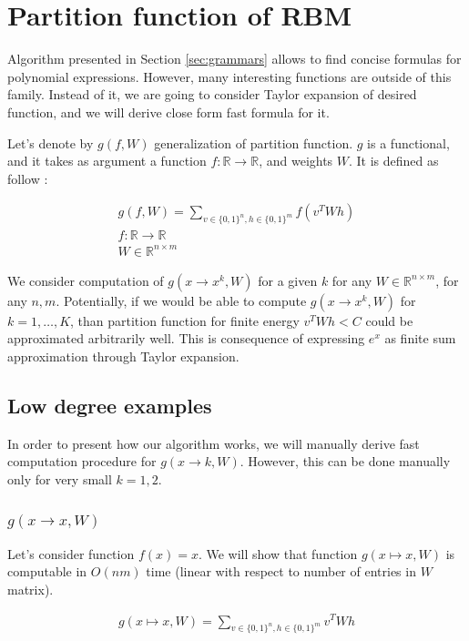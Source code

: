 \documentclass{article}
\begin{document}
\section{Partition function of RBM} \label{partitionfunction}
Algorithm presented in Section
\ref{sec:grammars} allows to find concise formulas for polynomial expressions.
However, many interesting functions are outside of this family.  Instead of it,
we are going to consider Taylor expansion of desired function, and we will
derive close form fast formula for it.

Let's denote by $g(f, W)$ generalization of partition function. 
$g$ is a functional, and it takes as argument a function $f : \mathbb{R} \rightarrow \mathbb{R}$,
and weights $W$. It is defined as follow : 

\begin{gather*}
g(f, W) = \sum_{v \in \{0, 1\}^n, h \in \{0, 1\}^m} f(v^TWh) \\
f : \mathbb{R} \rightarrow \mathbb{R}\\
W \in \mathbb{R}^{n \times m}
\end{gather*}

We consider computation of $g(x \rightarrow x^k, W)$ for a given $k$ for any $W
\in \mathbb{R}^{n \times m}$, for any $n, m$. Potentially, if we would be able
to compute $g(x \rightarrow x^k, W)$ for $k = 1, \dots, K$, than partition
function for finite energy $v^TWh < C$ could be approximated arbitrarily well.
This is consequence of expressing $e^{x}$ as finite sum approximation through
Taylor expansion.

\subsection{Low degree examples} In order to present how our algorithm works,
we will manually derive fast computation procedure for $g(x \rightarrow k, W)$.
However, this can be done manually only for very small $k = 1, 2$. 


\subsubsection{$g(x \rightarrow x, W)$} Let's consider function $f(x) = x$. We
will show that function $g(x \mapsto x, W)$ is computable in $O(nm)$ time
(linear with respect to number of entries in $W$ matrix).
 
\begin{gather*}
	g(x \mapsto x, W) = \sum_{v \in \{0, 1\}^n, h \in \{0, 1\}^m} v^TWh
\end{gather*}
\end{document}
